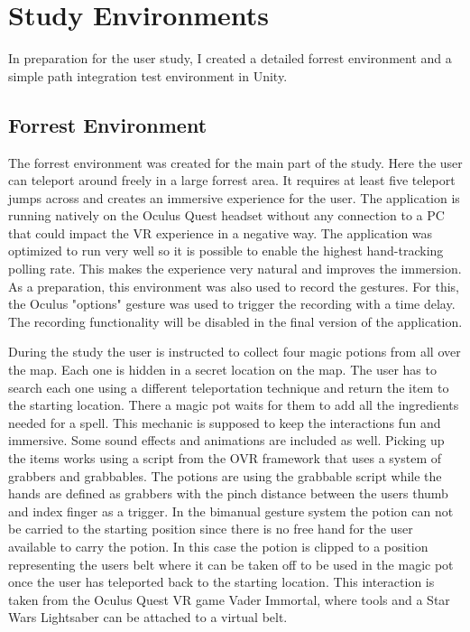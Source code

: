 
\chapter{Study Environments}
In preparation for the user study, I created a detailed forrest environment and a simple path integration test environment in Unity.



\section{Forrest Environment}

The forrest environment was created for the main part of the study. Here the user can teleport around freely in a large forrest area. It requires at least five teleport jumps across and creates an immersive experience for the user. The application is running natively on the Oculus Quest headset without any connection to a PC that could impact the VR experience in a negative way. The application was optimized to run very well so it is possible to enable the highest hand-tracking polling rate. This makes the experience very natural and improves the immersion. As a preparation, this environment was also used to record the gestures. For this, the Oculus "options" gesture was used to trigger the recording with a time delay. The recording functionality will be disabled in the final version of the application. %

During the study the user is instructed to collect four magic potions from all over the map. Each one is hidden in a secret location on the map. The user has to search each one using a different teleportation technique and return the item to the starting location. There a magic pot waits for them to add all the ingredients needed for a spell. This mechanic is supposed to keep the interactions fun and immersive. Some sound effects and animations are included as well. Picking up the items works using a script from the OVR framework that uses a system of grabbers and grabbables. The potions are using the grabbable script while the hands are defined as grabbers with the pinch distance between the users thumb and index finger as a trigger. In the bimanual gesture system the potion can not be carried to the starting position since there is no free hand for the user available to carry the potion. In this case the potion is clipped to a position representing the users belt where it can be taken off to be used in the magic pot once the user has teleported back to the starting location. This interaction is taken from the Oculus Quest VR game Vader Immortal, where tools and a Star Wars Lightsaber can be attached to a virtual belt. 


